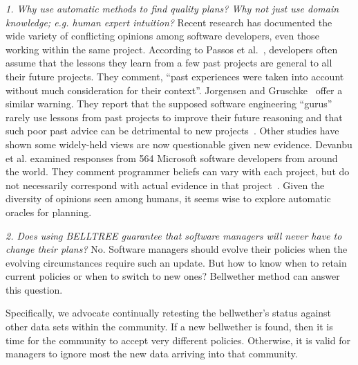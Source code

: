 \documentclass[10pt, journal, compsoc]{IEEEtran}
\begin{document}
\textit{1. Why use automatic methods to find quality plans? Why not just use domain knowledge; e.g. human expert intuition?} Recent research has documented the wide variety of conflicting opinions among software developers, even those working within the same project. According to Passos et al.~\cite{passos11}, developers often assume that the lessons they learn from a few past projects are general to all their future projects. They comment, ``past experiences were taken into account without
much consideration for their context''. Jorgensen and Gruschke~\cite{jorgensen09} offer a similar warning. They report that the supposed software engineering ``gurus'' rarely use lessons from past projects to improve their future reasoning and that such poor past advice can be detrimental to new projects~\cite{jorgensen09}. Other studies have shown some widely-held views are now questionable given new evidence. Devanbu et al. examined responses from 564 Microsoft software developers from around the world. They comment programmer beliefs can vary with each project, but do not necessarily correspond with actual evidence in that project~\cite{prem16}. Given the diversity of opinions seen among humans, it seems wise to explore automatic oracles for planning.

\textit{2. Does using BELLTREE guarantee that software managers will never have to change their plans?} No. Software managers should evolve their policies when the evolving circumstances require such an update. But how to know when to retain current policies or when to switch to new ones? Bellwether method can answer this question.

Specifically, we advocate continually retesting the bellwether's status against other data sets within the community. If a new bellwether is found, then it is time for the community to accept very different policies. Otherwise, it is valid for managers to ignore most the new data arriving into that community.
\end{document}
